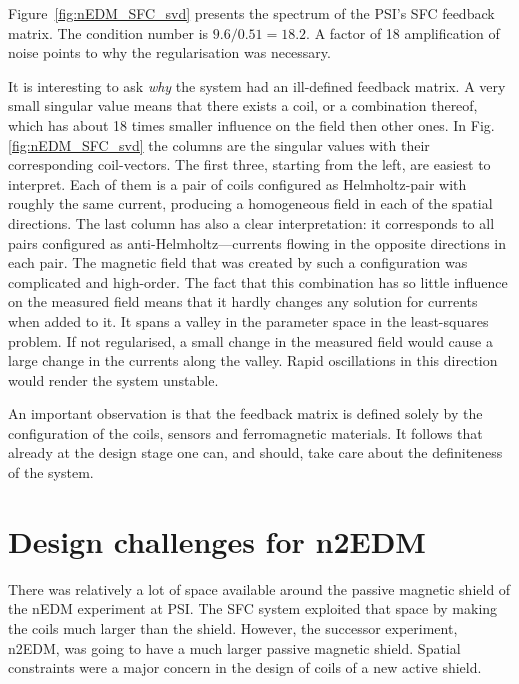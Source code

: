 Figure~\ref{fig:nEDM_SFC_svd} presents the spectrum of the PSI's SFC feedback matrix. The condition number is $9.6 / 0.51 = 18.2$. A factor of 18 amplification of noise points to why the regularisation was necessary.

It is interesting to ask \emph{why} the system had an ill-defined feedback matrix. A very small singular value means that there exists a coil, or a combination thereof, which has about 18 times smaller influence on the field then other ones. In Fig.\,\ref{fig:nEDM_SFC_svd} the columns are the singular values with their corresponding coil-vectors. The first three, starting from the left, are easiest to interpret. Each of them is a pair of coils configured as Helmholtz-pair with roughly the same current, producing a homogeneous field in each of the spatial directions.
The last column has also a clear interpretation: it corresponds to all pairs configured as anti-Helmholtz---currents flowing in the opposite directions in each pair. The magnetic field that was created by such a configuration was complicated and high-order. The fact that this combination has so little influence on the measured field means that it hardly changes any solution for currents when added to it. It spans a valley in the parameter space in the least-squares problem. If not regularised, a small change in the measured field would cause a large change in the currents along the valley. Rapid oscillations in this direction would render the system unstable.

An important observation is that the feedback matrix is defined solely by the configuration of the coils, sensors and ferromagnetic materials. It follows that already at the design stage one can, and should, take care about the definiteness of the system.





\section{Design challenges for n2EDM}
\label{sec:n2EDM_challenges}
There was relatively a lot of space available around the passive magnetic shield of the nEDM experiment at PSI\@. The SFC system exploited that space by making the coils much larger than the shield. However, the successor experiment, n2EDM, was going to have a much larger passive magnetic shield. Spatial constraints were a major concern in the design of coils of a new active shield.

